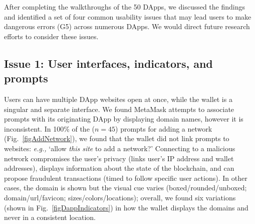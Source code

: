 \documentclass[conference]{IEEEtran}
\begin{document}
After completing the walkthroughs of the 50 DApps, we discussed the findings and identified a set of four common usability issues that may lead users to make dangerous errors (G5) across numerous DApps. We would direct future research efforts to consider these issues.


\subsection{Issue 1: User interfaces, indicators, and prompts}

Users can have multiple DApp websites open at once, while the wallet is a singular and separate interface. We found MetaMask attempts to associate prompts with its originating DApp by displaying domain names, however it is inconsistent.
In 100\% of the ($n=45$) prompts for adding a network (Fig.~\ref{figAddNetwork}), we found that the wallet did not link prompts to websites: \textit{e.g.,} `allow \textit{this site} to add a network?' Connecting to a malicious network compromises the user's privacy (links user's IP address and wallet addresses), displays information about the state of the blockchain, and can propose fraudulent transactions (timed to follow specific user actions). In other cases, the domain is shown but the visual cue varies (boxed/rounded/unboxed; domain/url/favicon; sizes/colors/locations); overall, we found six variations (shown in Fig.~\ref{figDappIndicators}) in how the wallet displays the domains and never in a consistent location.
\end{document}
